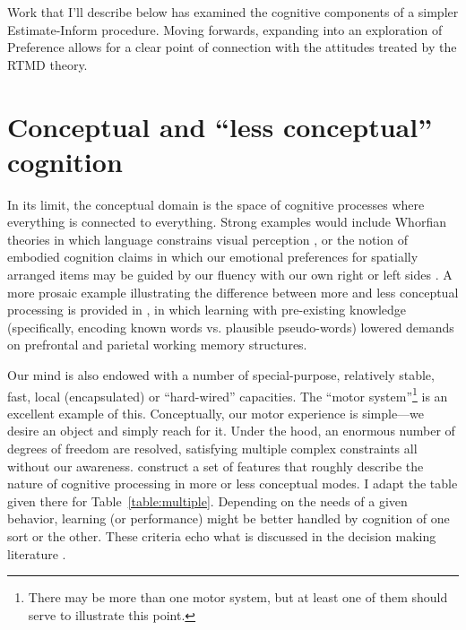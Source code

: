 Work that I'll describe below has examined the cognitive components of a simpler
Estimate-Inform procedure. Moving forwards, expanding into an exploration of
Preference allows for a clear point of connection with the attitudes treated by
the RTMD theory.

\section{Conceptual and ``less conceptual'' cognition\label{sec:two}}

In its limit, the conceptual domain is the space of cognitive processes where
everything is connected to everything. Strong examples would include Whorfian
theories in which language constrains visual perception
\cite{boroditsky_does_2001}, or the notion of embodied cognition claims in which
our emotional preferences for spatially arranged items may be guided by our
fluency with our own right or left sides \cite{casasanto_embodiment_2009}. A
more prosaic example illustrating the difference between more and less conceptual
processing is provided in , in which learning with
pre-existing knowledge (specifically, encoding known words vs. plausible
pseudo-words) lowered demands on prefrontal and parietal working memory
structures.

Our mind is also endowed with a number of special-purpose, relatively stable,
fast, local (encapsulated) or ``hard-wired'' capacities. The ``motor
system''\footnote{There may be more than one motor system, but at least one of
them should serve to illustrate this point.} is an excellent example of this.
Conceptually, our motor experience is simple---we desire an object and simply
reach for it. Under the hood, an enormous number of degrees of freedom are
resolved, satisfying multiple complex constraints all without our awareness.
 construct a set of features that roughly describe
the nature of cognitive processing in more or less conceptual modes. I adapt the
table given there for Table~\ref{table:multiple}.  Depending on the needs of a
given behavior, learning (or performance) might be better handled by cognition
of one sort or the other. These criteria echo what is discussed in the decision
making literature \cite{kahneman_perspective_2003}.

